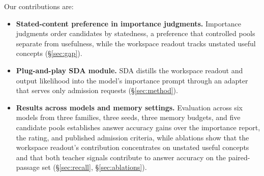 Our contributions are:
\begin{itemize}
    \item \textbf{Stated-content preference in importance judgments.}
    Importance judgments order candidates by statedness, a preference
    that controlled pools separate from usefulness, while the workspace
    readout tracks unstated useful concepts (\S\ref{sec:gap}).
    \item \textbf{Plug-and-play SDA module.} SDA distills the workspace
    readout and output likelihood into the model's importance prompt
    through an adapter that serves only admission requests
    (\S\ref{sec:method}).
    \item \textbf{Results across models and memory settings.} Evaluation
    across six models from three families, three seeds, three memory
    budgets, and five candidate pools establishes answer accuracy gains
    over the importance report, the rating, and published admission
    criteria, while ablations show that the workspace readout's
    contribution concentrates on unstated useful concepts and that both
    teacher signals contribute to answer accuracy on the paired-passage
    set (\S\ref{sec:recall}, \S\ref{sec:ablations}).
\end{itemize}
